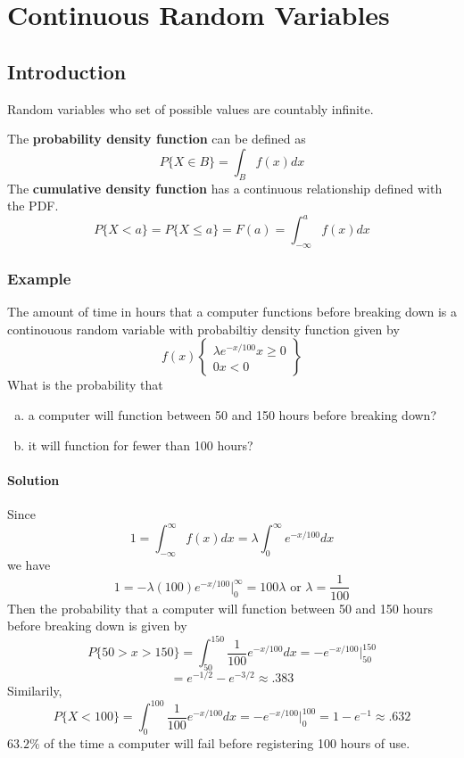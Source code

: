 \setcounter{chapter}{4}
\chapter{Continuous Random Variables}
\section{Introduction}
\begin{definition}
Random variables who set of possible values are countably infinite. 
\end{definition}
The \textbf{probability density function} can be defined as \[P\{X\in B\} = \int_B f(x) dx\]
The \textbf{cumulative density function} has a continuous relationship defined with the PDF. 
\[P\{X < a\} = P\{X\leq a\} = F(a) = \int^a_{-\infty} f(x) dx\]
\subsection*{Example}
The amount of time in hours that a computer functions before breaking down is a continouous random variable with probabiltiy density function given by 
\begin{equation*}
f(x) 
\left\{
    \begin{array}{lr}
        \lambda e^{-x/100} x\geq 0\\
        0 x < 0
    \end{array}
\right\}
\end{equation*}
What is the probability that 
\begin{enumerate}[a. ]
    \item a computer will function between 50 and 150 hours before breaking down?
    \item it will function for fewer than 100 hours?
\end{enumerate}
\subsubsection*{Solution}
Since \[1 = \int^\infty_{-\infty} f(x) dx = \lambda\int^\infty_0 e^{-x/100} dx\]
we have \[1 = -\lambda(100)e^{-x/100}\big|^\infty_0 = 100\lambda\text{ or } \lambda = \frac{1}{100}\]
Then the probability that a computer will function between 50 and 150 hours before breaking down is given by 
\[P\{50 > x > 150\} = \int^150_50 \frac{1}{100}e^{-x/100} dx = -e^{-x/100}\big|^150_50\]
\[=e^{-1/2} - e^{-3/2}\approx .383\]
Similarily, 
\[P\{X < 100\} = \int^100_0 \frac{1}{100}e^{-x/100} dx = -e^{-x/100}\big|^100_0 = 1 - e^{-1}\approx .632\]
$63.2\%$ of the time a computer will fail before registering 100 hours of use. 
